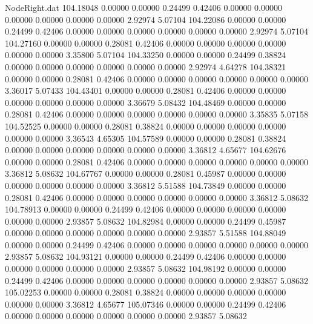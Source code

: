 \begin{filecontents}{NodeRight.dat}
 104.18048    0.00000    0.00000     0.24499    0.42406    0.00000    0.00000    0.00000    0.00000    0.00000    0.00000    2.92974    5.07104
 104.22086    0.00000    0.00000     0.24499    0.42406    0.00000    0.00000    0.00000    0.00000    0.00000    0.00000    2.92974    5.07104
 104.27160    0.00000    0.00000     0.28081    0.42406    0.00000    0.00000    0.00000    0.00000    0.00000    0.00000    3.35800    5.07104
 104.33250    0.00000    0.00000     0.24499    0.38824    0.00000    0.00000    0.00000    0.00000    0.00000    0.00000    2.92974    4.64278
 104.38321    0.00000    0.00000     0.28081    0.42406    0.00000    0.00000    0.00000    0.00000    0.00000    0.00000    3.36017    5.07433
 104.43401    0.00000    0.00000     0.28081    0.42406    0.00000    0.00000    0.00000    0.00000    0.00000    0.00000    3.36679    5.08432
 104.48469    0.00000    0.00000     0.28081    0.42406    0.00000    0.00000    0.00000    0.00000    0.00000    0.00000    3.35835    5.07158
 104.52525    0.00000    0.00000     0.28081    0.38824    0.00000    0.00000    0.00000    0.00000    0.00000    0.00000    3.36543    4.65305
 104.57589    0.00000    0.00000     0.28081    0.38824    0.00000    0.00000    0.00000    0.00000    0.00000    0.00000    3.36812    4.65677
 104.62676    0.00000    0.00000     0.28081    0.42406    0.00000    0.00000    0.00000    0.00000    0.00000    0.00000    3.36812    5.08632
 104.67767    0.00000    0.00000     0.28081    0.45987    0.00000    0.00000    0.00000    0.00000    0.00000    0.00000    3.36812    5.51588
 104.73849    0.00000    0.00000     0.28081    0.42406    0.00000    0.00000    0.00000    0.00000    0.00000    0.00000    3.36812    5.08632
 104.78913    0.00000    0.00000     0.24499    0.42406    0.00000    0.00000    0.00000    0.00000    0.00000    0.00000    2.93857    5.08632
 104.82984    0.00000    0.00000     0.24499    0.45987    0.00000    0.00000    0.00000    0.00000    0.00000    0.00000    2.93857    5.51588
 104.88049    0.00000    0.00000     0.24499    0.42406    0.00000    0.00000    0.00000    0.00000    0.00000    0.00000    2.93857    5.08632
 104.93121    0.00000    0.00000     0.24499    0.42406    0.00000    0.00000    0.00000    0.00000    0.00000    0.00000    2.93857    5.08632
 104.98192    0.00000    0.00000     0.24499    0.42406    0.00000    0.00000    0.00000    0.00000    0.00000    0.00000    2.93857    5.08632
 105.02253    0.00000    0.00000     0.28081    0.38824    0.00000    0.00000    0.00000    0.00000    0.00000    0.00000    3.36812    4.65677
 105.07346    0.00000    0.00000     0.24499    0.42406    0.00000    0.00000    0.00000    0.00000    0.00000    0.00000    2.93857    5.08632

\end{filecontents}
